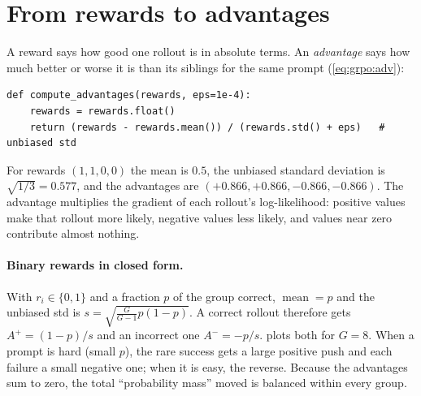 \section{From rewards to advantages}\label{sec:grpo:adv}

A reward says how good one rollout is in absolute terms. An \emph{advantage} says how much
better or worse it is than its siblings for the same prompt (\cref{eq:grpo:adv}):

\begin{lstlisting}[caption={Group-relative advantages.},label={lst:grpo:adv}]
def compute_advantages(rewards, eps=1e-4):
    rewards = rewards.float()
    return (rewards - rewards.mean()) / (rewards.std() + eps)   # unbiased std
\end{lstlisting}

For rewards $(1,1,0,0)$ the mean is $0.5$, the unbiased standard deviation is
$\sqrt{1/3}=0.577$, and the advantages are $(+0.866,+0.866,-0.866,-0.866)$. The advantage
multiplies the gradient of each rollout's log-likelihood: positive values make that
rollout more likely, negative values less likely, and values near zero contribute almost
nothing.

\paragraph{Binary rewards in closed form.} With $r_i\in\{0,1\}$ and a fraction $p$ of the
group correct, $\operatorname{mean}=p$ and the unbiased std is
$s=\sqrt{\tfrac{G}{G-1}p(1-p)}$. A correct rollout therefore gets
$A^+=(1-p)/s$ and an incorrect one $A^-=-p/s$.  plots both for
$G=8$. When a prompt is hard (small $p$), the rare success gets a large positive push and
each failure a small negative one; when it is easy, the reverse. Because the advantages sum
to zero, the total ``probability mass'' moved is balanced within every group.

